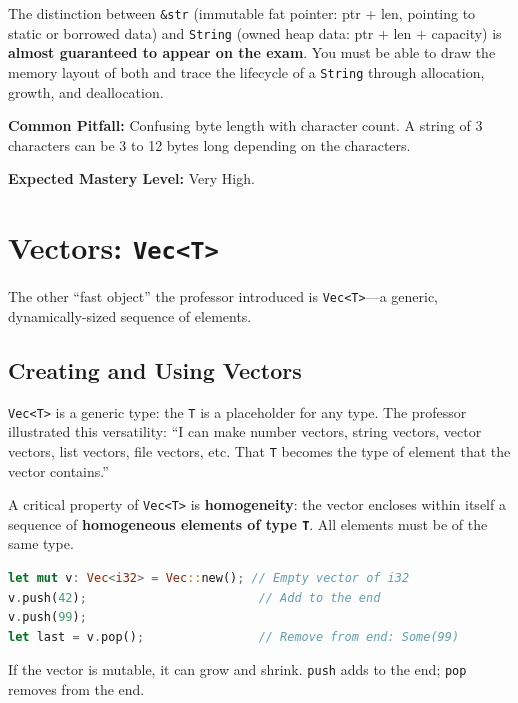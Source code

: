 \begin{examprioritybox}
The distinction between \texttt{\&str} (immutable fat pointer: ptr + len, pointing to static or borrowed data) and \texttt{String} (owned heap data: ptr + len + capacity) is \textbf{almost guaranteed to appear on the exam}. You must be able to draw the memory layout of both and trace the lifecycle of a \texttt{String} through allocation, growth, and deallocation.

\textbf{Common Pitfall:} Confusing byte length with character count. A string of 3 characters can be 3 to 12 bytes long depending on the characters.

\textbf{Expected Mastery Level:} Very High.
\end{examprioritybox}

\section{Vectors: \texttt{Vec<T>}}

The other ``fast object'' the professor introduced is \texttt{Vec<T>}---a generic, dynamically-sized sequence of elements.

\subsection{Creating and Using Vectors}

\texttt{Vec<T>} is a generic type: the \texttt{T} is a placeholder for any type. The professor illustrated this versatility: ``I can make number vectors, string vectors, vector vectors, list vectors, file vectors, etc. That \texttt{T} becomes the type of element that the vector contains.''

A critical property of \texttt{Vec<T>} is \textbf{homogeneity}: the vector encloses within itself a sequence of \textbf{homogeneous elements of type \texttt{T}}. All elements must be of the same type.

\begin{lstlisting}[language=Rust]
let mut v: Vec<i32> = Vec::new(); // Empty vector of i32
v.push(42);                        // Add to the end
v.push(99);
let last = v.pop();                // Remove from end: Some(99)
\end{lstlisting}

If the vector is mutable, it can grow and shrink. \texttt{push} adds to the end; \texttt{pop} removes from the end.

